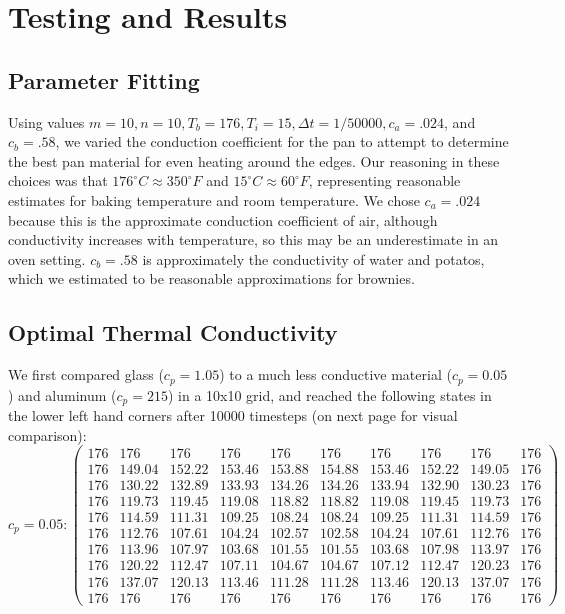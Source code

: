 \documentclass[12pt]{reedmcm}
\begin{document}
\section{Testing and Results}
\subsection{Parameter Fitting}
Using values $m = 10, n=10, T_b = 176, T_i = 15, \Delta t = 1/50000, c_a = .024$, and $c_b = .58$, we varied the conduction coefficient for the pan to attempt to determine the best pan material for even heating around the edges.  Our reasoning in these choices was that $176^\circ C \approx 350^\circ F$ and $15^\circ C \approx 60^\circ F$, representing reasonable estimates for baking temperature and room temperature.  We chose $c_a = .024$ because this is the approximate conduction coefficient of air, although conductivity increases with temperature, so this may be an underestimate in an oven setting.  $c_b = .58$ is approximately the conductivity of water and potatos, which we estimated to be reasonable approximations for brownies.\\

\subsection{Optimal Thermal Conductivity}
We first compared glass ($c_p = 1.05$) to a much less conductive material ($c_p = 0.05$) and aluminum ($c_p = 215$) in a 10x10 grid, and reached the following states in the lower left hand corners after 10000 timesteps (on next page for visual comparison):\newpage
\[c_p = 0.05: \begin{pmatrix} 176&176&176&176&176&176&176&176&176&176\\
176&149.04&152.22&153.46&153.88&154.88&153.46&152.22&149.05&176\\
176&130.22&132.89&133.93&134.26&134.26&133.94&132.90&130.23&176\\
176&119.73&119.45&119.08&118.82&118.82&119.08&119.45&119.73&176\\
176&114.59&111.31&109.25&108.24&108.24&109.25&111.31&114.59&176\\
176&112.76&107.61&104.24&102.57&102.58&104.24&107.61&112.76&176\\
176&113.96&107.97&103.68&101.55&101.55&103.68&107.98&113.97&176\\
176&120.22&112.47&107.11&104.67&104.67&107.12&112.47&120.23&176\\
176&137.07&120.13&113.46&111.28&111.28&113.46&120.13&137.07&176\\
176&176&176&176&176&176&176&176&176&176\end{pmatrix}\]
\end{document}
